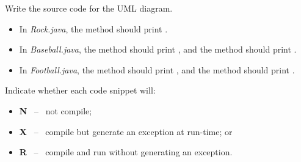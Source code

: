 \documentclass[12pt]{article}
\begin{document}
\Q Write the source code for the UML diagram.

\begin{itemize}

\item In \textit{Rock.java}, the  method should print .

\item In \textit{Baseball.java}, the  method should print , and the  method should print .

\item In \textit{Football.java}, the  method should print , and the  method should print .

\end{itemize}


\Q Indicate whether each code snippet will:

\begin{itemize}[itemsep=1ex]
\item \textbf{N} ~--~ not compile;
\item \textbf{X} ~--~ compile but generate an exception at run-time; or
\item \textbf{R} ~--~ compile and run without generating an exception.
\end{itemize}
\end{document}
